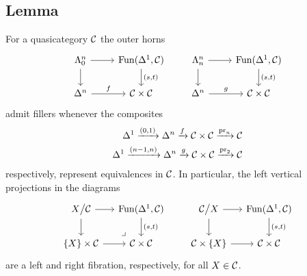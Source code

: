     \subsection{Lemma}\label{chVI-3-31}
        For a quasicategory $\mathcal{C}$ the outer horns
        \begin{equation*}
            \begin{tikzcd}
                \horn{n}{0} \arrow[d] \arrow[r] & \Fun(\Delta^1, \Cc) \arrow[d, "(s{,}t)"] \\
                \Delta^n \arrow[r, "f"] & \Cc \times \Cc
            \end{tikzcd}
            \qquad
            \begin{tikzcd}
                \horn{n}{n} \arrow[d] \arrow[r] & \Fun(\Delta^1, \Cc) \arrow[d, "(s{,}t)"] \\
                \Delta^n \arrow[r, "g"] & \Cc \times \Cc
            \end{tikzcd}
        \end{equation*}	
        admit fillers whenever the composites
        \begin{align*}
            \Delta^1 \xrightarrow{(0, 1)} \Delta^n \xrightarrow{f} \mathcal{C} \times \mathcal{C} \xrightarrow{\operatorname{pr}_n} \mathcal{C} \\
            \Delta^1 \xrightarrow{(n-1, n)} \Delta^n \xrightarrow{g} \mathcal{C} \times \mathcal{C} \xrightarrow{\operatorname{pr}_2} \mathcal{C}
        \end{align*}	
        respectively, represent equivalences in $\mathcal{C}$. In particular, the left vertical projections in the diagrams
        \begin{equation*}
            \begin{tikzcd}[column sep=small]
                X \big/ \Cc \arrow[d] \arrow[r] \arrow[rd, phantom, "\lrcorner" very near end]& \Fun(\Delta^1, \Cc) \arrow[d, "(s{,}t)"] \\
                \{ X \} \times \Cc \arrow[r] & \Cc \times \Cc
            \end{tikzcd}
            \qquad
            \begin{tikzcd}[column sep=small]
                \Cc \big/ X \arrow[d] \arrow[r] & \Fun(\Delta^1, \Cc) \arrow[d, "(s{,}t)"] \\
                \Cc \times \{ X \} \arrow[r] & \Cc \times \Cc
            \end{tikzcd}
        \end{equation*}
        are a left and right fibration, respectively, for all $X \in \mathcal{C}$.
        \smallskip

